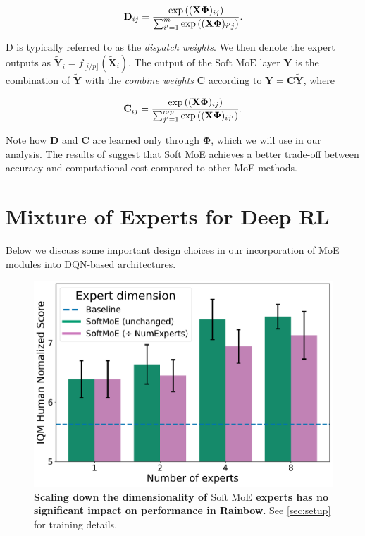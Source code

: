 \documentclass{article}
\theoremstyle{plain}
\theoremstyle{definition}
\theoremstyle{remark}
\newcommand{\softmoe}{$\textrm{Soft MoE}$}
\begin{document}
\begin{equation}
\begin{gathered}
\mathbf{D}_{i j}=\frac{\exp \left((\mathbf{X} \boldsymbol{\Phi})_{i j}\right)}{\sum_{i^{\prime}=1}^m \exp \left((\mathbf{X} \boldsymbol{\Phi})_{i^{\prime} j}\right)}. \notag
\end{gathered}
\end{equation}

D is typically referred to as the \textit{dispatch weights}. We then denote the expert outputs as $\tilde{\mathbf{Y}}_i=f_{\lfloor i / p\rfloor}\left(\tilde{\mathbf{X}}_i\right)$.
The output of the \softmoe{} layer $\mathbf{Y}$ is the combination of $\tilde{\mathbf{Y}}$ with the \textit{combine weights} $\mathbf{C}$ according to $\mathbf{Y}=\mathbf{C} \tilde{\mathbf{Y}}$, where

\begin{equation}
\begin{gathered}
\mathbf{C}_{i j}=\frac{\exp \left((\mathbf{X} \boldsymbol{\Phi})_{i j}\right)}{\sum_{j^{\prime}=1}^{n \cdot p} \exp \left((\mathbf{X} \boldsymbol{\Phi})_{i j^{\prime}}\right)} \notag.
\end{gathered}
\end{equation}

Note how $\mathbf{D}$ and $\mathbf{C}$ are learned only through $\boldsymbol{\Phi}$, which we will use in our analysis.
The results of \citet{puigcerver2023sparse} suggest that Soft MoE achieves a better trade-off between accuracy and computational cost compared to other MoE methods.
\section{ Mixture of Experts for Deep RL}
\label{sec:moesForDRL}

Below we discuss some important design choices in our incorporation of MoE modules into DQN-based architectures.

\begin{figure}[!t]
    \centering
    \includegraphics[width=0.8\linewidth]{figures/rainbowScalingPlot.pdf}
    \caption{{\bf Scaling down the dimensionality of \softmoe{} experts has no significant impact on performance in Rainbow}. See \cref{sec:setup} for training details.}
    \label{fig:rainbowScaling}%
\end{figure}
\end{document}
